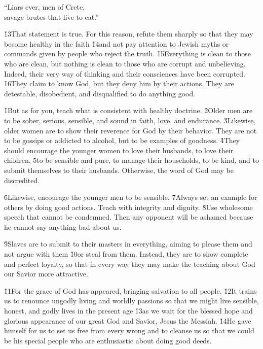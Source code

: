 \begin{poetry}
\poeml ``Liars ever, men of Crete, \\
\poemll    savage brutes that live to eat.''
\end{poetry}

\v{13}That statement is true. For this reason, refute them sharply so that they may become healthy in the faith \v{14}and not pay attention to Jewish myths or commands given by people who reject the truth. \v{15}Everything is clean to those who are clean, but nothing is clean to those who are corrupt and unbelieving. Indeed, their very way of thinking and their consciences have been corrupted. \v{16}They claim to know God, but they deny him by their actions. They are detestable, disobedient, and disqualified to do anything good.

\v{1}But as for you, teach what is consistent with healthy doctrine. \v{2}Older men are to be sober, serious, sensible, and sound in faith, love, and endurance. \v{3}Likewise, older women are to show their reverence for God by their behavior. They are not to be gossips or addicted to alcohol, but to be examples of goodness. \v{4}They should encourage the younger women to love their husbands, to love their children, \v{5}to be sensible and pure, to manage their households, to be kind, and to submit themselves to their husbands. Otherwise, the word of God may be discredited.

\v{6}Likewise, encourage the younger men to be sensible. \v{7}Always set an example for others by doing good actions. Teach with integrity and dignity. \v{8}Use wholesome speech that cannot be condemned. Then any opponent will be ashamed because he cannot say anything bad about us.

\v{9}Slaves are to submit to their masters in everything, aiming to please them and not argue with them \v{10}or steal from them. Instead, they are to show complete and perfect loyalty, so that in every way they may make the teaching about God our Savior more attractive.

\v{11}For the grace of God has appeared, bringing salvation to all people. \v{12}It trains us to renounce ungodly living and worldly passions so that we might live sensible, honest, and godly lives in the present age \v{13}as we wait for the blessed hope and glorious appearance of our great God and Savior, Jesus the Messiah. \v{14}He gave himself for us to set us free from every wrong and to cleanse us so that we could be his special people who are enthusiastic about doing good deeds.

